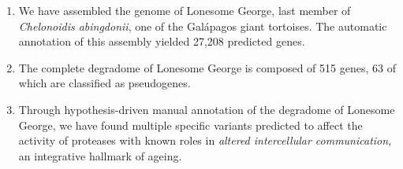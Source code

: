 \begin{enumerate}
    \item We have assembled the genome of Lonesome George, last member of \textit{Chelonoidis abingdonii}, one of the Gal\'{a}pagos giant tortoises. The automatic annotation of this assembly yielded 27,208 predicted genes.
    \item The complete degradome of Lonesome George is composed of 515 genes, 63 of which are classified as pseudogenes.
    \item Through hypothesis-driven manual annotation of the degradome of Lonesome George, we have found multiple specific variants predicted to affect the activity of proteases with known roles in \emph{altered intercellular communication}, an integrative hallmark of ageing.
\end{enumerate}
